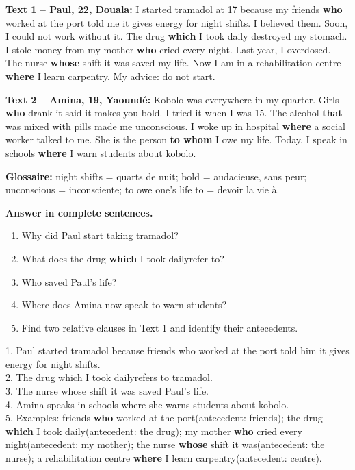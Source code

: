 \documentclass[11pt]{article}
\newcommand{\cle}[1]{{\popxbold\color{popdark}#1}}
\begin{document}
\begin{exemplebox}
\textbf{Text 1 -- Paul, 22, Douala:}
\og I started tramadol at 17 because my friends \textbf{who} worked at the port told me it gives energy for night shifts. I believed them. Soon, I could not work without it. The drug \textbf{which} I took daily destroyed my stomach. I stole money from my mother \textbf{who} cried every night. Last year, I overdosed. The nurse \textbf{whose} shift it was saved my life. Now I am in a rehabilitation centre \textbf{where} I learn carpentry. My advice: do not start.\fg

\textbf{Text 2 -- Amina, 19, Yaound\'e:}
\og Kobolo was everywhere in my quarter. Girls \textbf{who} drank it said it makes you bold. I tried it when I was 15. The alcohol \textbf{that} was mixed with pills made me unconscious. I woke up in hospital \textbf{where} a social worker talked to me. She is the person \textbf{to whom} I owe my life. Today, I speak in schools \textbf{where} I warn students about kobolo.\fg

\textbf{Glossaire:} \cle{night shifts} = quarts de nuit; \cle{bold} = audacieuse, sans peur; \cle{unconscious} = inconsciente; \cle{to owe one's life to} = devoir la vie \`a.
\end{exemplebox}

\begin{exercice}
\textbf{Answer in complete sentences.}
\begin{enumerate}
\item Why did Paul start taking tramadol?
\item What does \og the drug \textbf{which} I took daily\fg refer to?
\item Who saved Paul's life?
\item Where does Amina now speak to warn students?
\item Find two relative clauses in Text 1 and identify their antecedents.
\end{enumerate}
\end{exercice}

\begin{corrige}
1. Paul started tramadol because friends who worked at the port told him it gives energy for night shifts. \\
2. \og The drug which I took daily\fg refers to tramadol. \\
3. The nurse whose shift it was saved Paul's life. \\
4. Amina speaks in schools where she warns students about kobolo. \\
5. Examples: \og friends \textbf{who} worked at the port\fg (antecedent: friends); \og the drug \textbf{which} I took daily\fg (antecedent: the drug); \og my mother \textbf{who} cried every night\fg (antecedent: my mother); \og the nurse \textbf{whose} shift it was\fg (antecedent: the nurse); \og a rehabilitation centre \textbf{where} I learn carpentry\fg (antecedent: centre).
\end{corrige}
\end{document}
